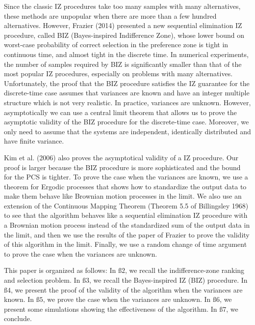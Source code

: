 \documentclass{wscpaperproc}
\theoremstyle{wsc}
\begin{document}
Since the classic IZ procedures take too many samples with many alternatives,
these methods are unpopular when there are more than a few hundred
alternatives. However, Frazier (2014) presented a new sequential elimination
IZ procedure, called BIZ (Bayes-inspired Indifference Zone), whose
lower bound on worst-case probability of correct selection in the
preference zone is tight in continuous time, and almost tight in the
discrete time. In numerical experiments, the number of samples required
by BIZ is significantly smaller than that of the most popular IZ procedures,
especially on problems with many alternatives. Unfortunately, the
proof that the BIZ procedure satisfies the IZ guarantee for the discrete-time
case assumes that variances are known and have an integer multiple
structure which is not very realistic. In practice, variances are
unknown. However, asymptotically we can use a central limit theorem
that allows us to prove the asymptotic validity of the BIZ procedure
for the discrete-time case. Moreover, we only need to assume that
the systems are independent, identically distributed and have finite
variance.

Kim et al. (2006) also proves the asymptotical validity of a IZ procedure.
Our proof is larger because the BIZ procedure is more sophisticated
and the bound for the PCS is tighter. To prove the case when the variances
are known, we use a theorem for Ergodic processes that shows how to
standardize the output data to make them behave like Brownian motion
processes in the limit. We also use an extension of the Continuous
Mapping Theorem (Theorem 5.5 of Billingsley 1968) to see that the
algorithm behaves like a sequential elimination IZ procedure with
a Brownian motion process instead of the standardized sum of the output
data in the limit, and then we use the results of the paper of Frazier
\cite{key-5} to prove the validity of this algorithm in the limit.
Finally, we use a random change of time argument to prove the case
when the variances are unknown.

This paper is organized as follows: In $\text{ß}2$, we recall the
indifference-zone ranking and selection problem. In $\text{ß}3$,
we recall the Bayes-inspired IZ (BIZ) procedure. In $\text{ß}4$,
we present the proof of the validity of the algorithm when the variances
are known. In $\text{ß}5$, we prove the case when the variances are
unknown. In $\text{ß}6$, we present some simulations showing the
effectiveness of the algorithm. In $\text{ß}7$, we conclude.
\end{document}
